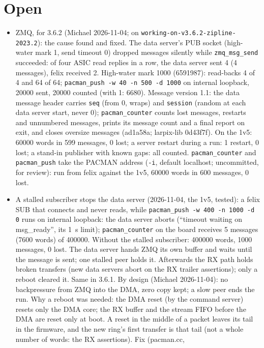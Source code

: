 \documentclass[11pt]{article}
\newcommand{\br}[1]{\texttt{#1}}
\newcommand{\h}[1]{\texttt{#1}}
\begin{document}
\section{Open}

\begin{itemize}
\item ZMQ, for 3.6.2 (Michael 2026-11-04;  on \br{working-on-v3.6.2-zipline-2023.2}):  the cause found and fixed.
  The data server's PUB socket (high-water mark 1, send timeout 0) dropped messages silently while
  \h{zmq\_msg\_send} succeeded:  of four ASIC read replies in a row, the data server sent 4 (4 messages), felix
  received 2.  High-water mark 1000 (6591987):  read-backs 4 of 4 and 64 of 64;  \h{pacman\_push -w 40 -n 500 -d 1000}
  on internal loopback, 20000 sent, 20000 counted (with 1:  6680).  Message version 1.1:  the data
  message header carries \h{seq} (from 0, wraps) and \h{session} (random at each data server start, never 0);
  \h{pacman\_counter} counts lost messages, restarts and unnumbered messages, prints its message count and a final
  report on exit, and closes oversize messages (ad1a58a;  larpix-lib 0d43f7f).  On the 1v5:  60000 words in 599 messages,
  0 lost;  a server restart during a run:  1 restart, 0 lost;  a stand-in publisher with known gaps:  all counted.
  \h{pacman\_counter} and \h{pacman\_push} take the PACMAN address (\h{-i}, default localhost;  uncommitted, for
  review):  run from felix against the 1v5, 60000 words in 600 messages, 0 lost.
\item A stalled subscriber stops the data server (2026-11-04, the 1v5, tested):  a felix SUB that connects and never
  reads, while \h{pacman\_push -w 400 -n 1000 -d 0} runs on internal loopback:  the data server aborts (``timeout
  waiting on msg\_ready'', its 1~s limit);  \h{pacman\_counter} on the board receives 5 messages (7600 words) of 400000.
  Without the stalled subscriber:  400000 words, 1000 messages, 0 lost.  The data server hands ZMQ its own buffer
  and waits until the message is sent;  one stalled peer holds it.  Afterwards the RX path holds broken transfers
  (new data servers abort on the RX trailer assertions);  only a reboot cleared it.  Same in 3.6.1.  By design
  (Michael 2026-11-04):  no backpressure from ZMQ into the DMA, zero copy kept;  a slow peer ends the run.
  Why a reboot was needed:  the DMA reset (by the command server) resets only the DMA core;  the RX buffer and the
  stream FIFO before the DMA are reset only at boot.  A reset in the middle of a packet leaves its tail in the firmware,
  and the new ring's first transfer is that tail (not a whole number of words:  the RX assertions).  Fix (pacman.cc,

\end{itemize}
\end{document}
